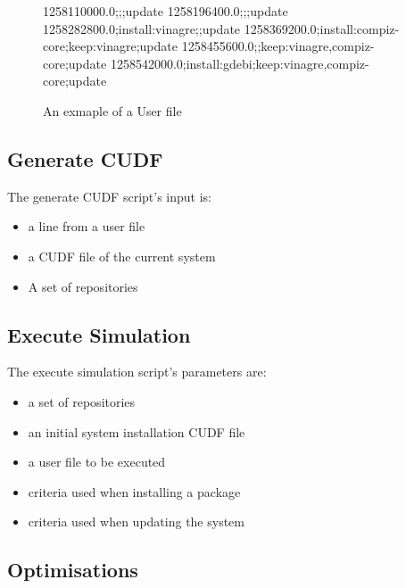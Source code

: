 \begin{figure}[htp]
\begin{center}
1258110000.0;;;update
1258196400.0;;;update
1258282800.0;install:vinagre;;update
1258369200.0;install:compiz-core;keep:vinagre;update
1258455600.0;;keep:vinagre,compiz-core;update
1258542000.0;install:gdebi;keep:vinagre,compiz-core;update
  \caption[User File example]{An exmaple of a User file}
  \label{userfile}
\end{center}
\end{figure}

\subsection{Generate CUDF}
The generate CUDF script's input is:
\begin{itemize}
  \item a line from a user file 
  \item a CUDF file of the current system
  \item A set of repositories
\end{itemize}


\subsection{Execute Simulation}
The execute simulation script's parameters are:
\begin{itemize}
  \item a set of repositories
  \item an initial system installation CUDF file
  \item a user file to be executed
  \item criteria used when installing a package
  \item criteria used when updating the system
\end{itemize}


\subsection{Optimisations}



